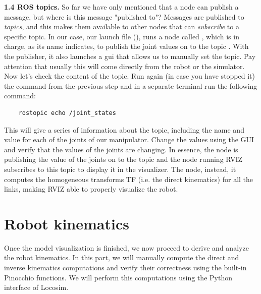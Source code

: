 \documentclass[11pt]{article}
\begin{document}
\textbf{1.4 ROS topics.} So far we have only mentioned that a node can publish a message, but where is this message "published to"? Messages are published to \textit{topics}, and this makes them available to other nodes that can \textit{subscribe} to a specific topic. In our case, our launch file (), runs a node called , which is in charge, as its name indicates, to publish the joint values on to the topic . With the publisher, it also launches a gui that allows us to manually set the  topic. Pay attention that usually this  will come directly from the robot or the simulator. Now let's check the content of the  topic. Run again (in case you have stopped it) the command from the previous step and in a separate terminal run the following command:
%
\begin{verbatim}
	rostopic echo /joint_states
\end{verbatim}
This will give a series of information about the  topic, including the name and value for each of the joints of our manipulator. Change the values using the GUI and verify that the values of the joints are changing. In essence, the  node is publishing the value of the joints on to the  topic and the node running RVIZ subscribes to this topic to display it in the visualizer.
The  node, instead, it computes the homogeneous transforms TF (i.e. the direct kinematics) for all the links, making RVIZ able to properly visualize the robot. 

\section{Robot kinematics}
Once the model visualization is finished, we now proceed to derive and analyze the robot kinematics. In this part, we will manually compute the direct and inverse kinematics computations and verify their correctness using the built-in Pinocchio functions. We will perform this computations using the Python interface of Locosim. \\
\end{document}
